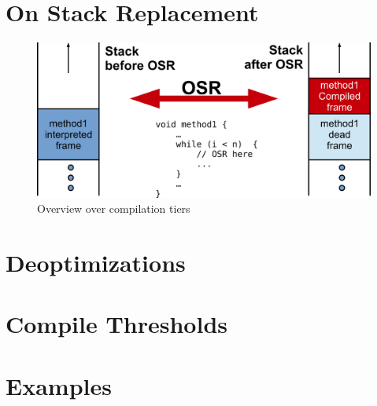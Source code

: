 \section{On Stack Replacement}
\begin{figure}[h]
  \begin{center}
    \centering
    \includegraphics{figures/osr.png}
    \caption{Overview over compilation tiers}
    \label{fig:osr}
  \end{center}
\end{figure}
\section{Deoptimizations}
\label{sec:deoptimizations}

\section{Compile Thresholds}

\section{Examples}
